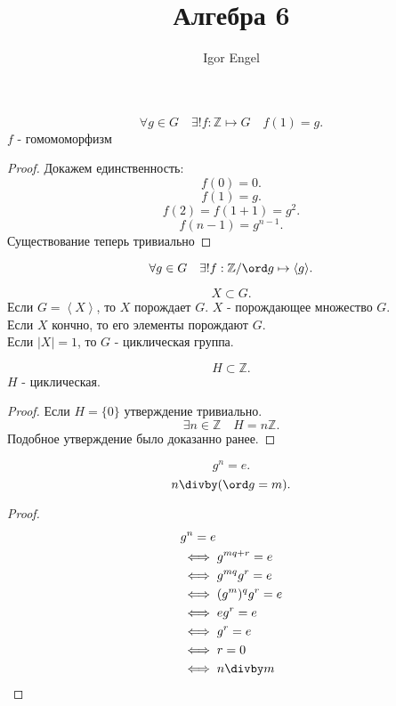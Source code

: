 \documentclass[11pt, oneside]{article}   	%
\title{Алгебра 6}
\author{Igor Engel}
\date{}
\begin{document}
\maketitle
\section{}
    \begin{theorem}
        \[ \forall{g\in G}\quad \exists!{f: \mathbb{Z} \mapsto  G}\quad f(1) = g  .\] 
        $f$ - гомомоморфизм
        \begin{proof}
            Докажем единственность:
            \[ f(0) = 0 .\]
            \[ f(1) = g .\]
            \[ f(2) = f(1+1) = g^2 .\]
            \[ f(n-1) = g^{n-1} .\]
            Существование теперь тривиально 
        \end{proof}
    \end{theorem}
    \begin{theorem}
        \[ \forall{g\in G}\quad \exists!{f: \mathbb{Z}/\ord g \mapsto \left<g\right>} .\] 
    \end{theorem}
    \begin{definition}
        \[ X \subset G .\]
        Если $G = \left<X\right>$, то $X$ порождает $G$. $X$ - порождающее множество $G$.\\
        Если $X$ кончно, то его элементы порождают $G$.\\
        Если $|X| = 1$, то $G$ - циклическая группа.
    \end{definition}
    \begin{dlemma}
        \[ H \subset \mathbb{Z} .\]
        $H$ - циклическая.
        \begin{proof}
            Если $H = \{0\} $ утверждение тривиально.
            \[ \exists{n\in \mathbb{Z}}\quad H = n \mathbb{Z}  .\]
            Подобное утверждение было доказанно ранее.
        \end{proof}
    \end{dlemma}
    \begin{dlemma}
        \[ g^{n} = e .\]
        \[ n\divby (\ord g=m) .\]
        \begin{proof}
            \begin{equation*}
                \begin{split} 
                    &g^{n} = e\\
                    &\iff g^{mq+r} = e\\
                    &\iff g^{mq}g^{r} = e\\
                    &\iff (g^{m})^{q}g^{r} = e\\
                    &\iff eg^{r} = e\\
                    &\iff g^{r} = e\\
                    &\iff r = 0\\
                    &\iff n\divby m \qedhere  
                \end{split}
            \end{equation*}
        \end{proof}
    \end{dlemma}
\end{document}
